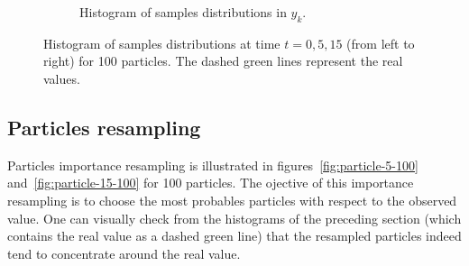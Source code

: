 \documentclass[english, DIV=13]{scrartcl}
\begin{document}
\begin{figure}
\begin{subfigure}{0.49\textwidth}
        \caption{Histogram of samples distributions in $y_k$.}
        \label{fig:q3-hist-y-100}
    \end{subfigure}
    \caption{Histogram of samples distributions  at time $t = 0, 5, 15$
    (from left to right) for 100 particles. The dashed green lines represent the real
    values.}
    \label{fig:q3-hist}
\end{figure}

\subsection{Particles resampling}
Particles importance resampling is illustrated in figures~\ref{fig:particle-5-100}
and~\ref{fig:particle-15-100} for 100 particles. The ojective of this importance
resampling is to choose the most probables particles with respect to the observed
value. One can visually check from the histograms of the preceding section (which
contains the real value as a dashed green line) that the resampled particles indeed tend
to concentrate around the real value.
\end{document}
